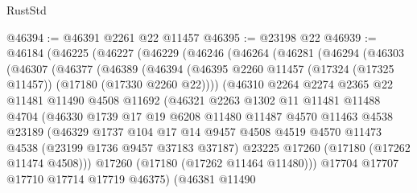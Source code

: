 \begin{lexlean}{RustStd}
\begin{coremodule}
@46394 := @46391 @2261 @22 @11457
@46395 := @23198 @22
@46939 := @46184
    (@46225
      (@46227
        (@46229
          (@46246
            (@46264
              (@46281
                (@46294
                  (@46303
                    (@46307
                      (@46377
                        (@46389
                          (@46394
                            (@46395
                              @2260
                              @11457
                              (@17324 (@17325 @11457))
                              (@17180 (@17330 @2260 @22))))
                          (@46310
                            @2264
                            @2274
                            @2365
                            @22
                            @11481
                            @11490
                            @4508
                            @11692
                            (@46321
                              @2263
                              @1302
                              @11
                              @11481
                              @11488
                              @4704
                              (@46330
                                @1739
                                @17
                                @19
                                @6208
                                @11480
                                @11487
                                @4570
                                @11463
                                @4538
                                @23189
                                (@46329
                                  @1737
                                  @104
                                  @17
                                  @14
                                  @9457
                                  @4508
                                  @4519
                                  @4570
                                  @11473
                                  @4538
                                  (@23199 @1736 @9457 @37183 @37187)
                                  @23225
                                  @17260
                                  (@17180 (@17262 @11474 @4508)))
                                @17260
                                (@17180 (@17262 @11464 @11480)))
                              @17704
                              @17707
                              @17710
                              @17714
                              @17719
                              @46375)
                            (@46381
                              @11490

\end{coremodule}
\end{lexlean}
